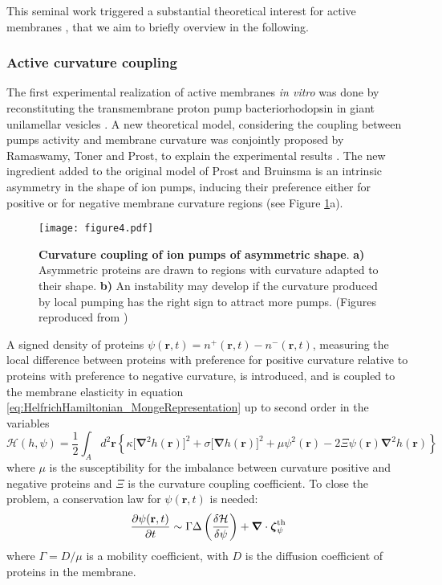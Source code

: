 \documentclass[graybox]{svmult}
\begin{document}
				This seminal work triggered a substantial theoretical interest for active membranes \cite{Turlier:2016, Ramaswamy:2000, Manneville:1999, Manneville:2001, Lomholt:2006, Loubet:2012, Chen:2004, Chen:2010, Gov:2004, Gov:2005, Gov:2006, Gov:2007, Lacoste:2005, Sankararaman:2002}, that we aim to briefly overview in the following.
				
		\subsubsection{Active curvature coupling}
		The first experimental realization of active membranes \textit{in vitro} was done by reconstituting the transmembrane proton pump bacteriorhodopsin in giant unilamellar vesicles \cite{Manneville:1999, Manneville:2001}. A new theoretical model, considering the coupling between pumps activity and membrane curvature was conjointly proposed by Ramaswamy, Toner and Prost, to explain the experimental results \cite{Ramaswamy:2000}. The new ingredient added to the original model of Prost and Bruinsma \cite{Prost:1996} is an intrinsic asymmetry in the shape of ion pumps, inducing their preference either for positive or for negative membrane curvature regions (see Figure \ref{fig:fig4}a).
	
\begin{figure}
	\centering
		\texttt{[image: figure4.pdf]}
	\caption{\textbf{Curvature coupling of ion pumps of asymmetric shape}. \textbf{a)} Asymmetric proteins are drawn to regions with curvature adapted to their shape. \textbf{b)} An instability may develop if the curvature produced by local pumping has the right sign to attract more pumps. (Figures reproduced from \cite{Ramaswamy:2000})}
	\label{fig:fig4}
\end{figure}

		A signed density of proteins $\psi(\mathbf{r},t) = n^{+}(\mathbf{r},t) - n^{-}(\mathbf{r},t)$, measuring the local difference between proteins with preference for positive curvature relative to proteins with preference to negative curvature, is introduced, and is coupled to the membrane elasticity in equation \eqref{eq:HelfrichHamiltonian_MongeRepresentation} up to second order in the variables
		\begin{equation}
		\mathcal{H}(h,\psi) = \frac{1}{2}\int_A d^2\mathbf{r}\left\lbrace \kappa\big[\boldsymbol{\nabla}^2{h}(\mathbf{r})\big]^2 + \sigma\big[\boldsymbol{\nabla}h(\mathbf{r})\big]^2 + \mu\psi^2(\mathbf{r}) - 2\Xi\psi(\mathbf{r})\boldsymbol{\nabla}^2 h(\mathbf{r}) \right\rbrace
		\end{equation}
where $\mu$ is the susceptibility for the imbalance between curvature positive and negative proteins and $\Xi$ is the curvature coupling coefficient. 
To close the problem, a conservation law for $\psi(\mathbf{r},t)$ is needed:
\begin{equation}
	\frac{\partial \psi(\mathbf{r},t)}{\partial t} \sim \Gamma\Delta\left(\frac{\delta\mathcal{H}}{\delta\psi}\right) + \boldsymbol{\nabla}\cdot \boldsymbol{\zeta}_{\psi}^{\rm{th}}
\end{equation}
where $\Gamma = D/\mu$ is a mobility coefficient, with $D$ is the diffusion coefficient of proteins in the membrane.
\end{document}
